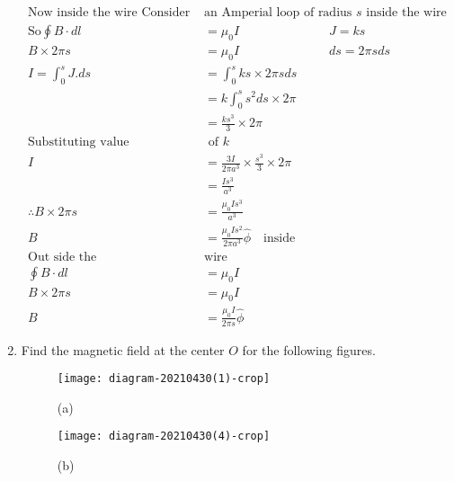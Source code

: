 \begin{enumerate}[ label=\color{ocre}\textbf{\arabic*.}]
\begin{answer}
\begin{align*}
		\text{Now inside the wire Consider }&\text{an Amperial loop of radius \ $s$\ inside the wire}\\
		\text{So}\oint B\cdot dl&=\mu_0I \hspace{3cm}J=ks\\
		B\times2\pi s&=\mu_0I\hspace{3cm}ds=2\pi sds\\
		I=\int_{0}^{s}J.ds&=\int_{0}^{s}ks\times2\pi sds\\
		&=k\int_{0}^{s}s^2 ds\times2\pi\\
		&=\frac{ks^3}{3}\times2\pi\\
		\text{Substituting  value }&\text{ of }k\\
		I&=\frac{3 I}{2\pi a^3}\times\frac{s^3}{3}\times2\pi\\
		&=\frac{Is^3}{a^3}\\
		\therefore B\times2\pi s&=\frac{\mu_0Is^3}{a^3}\\
		B&=\frac{\mu_0Is^2}{2\pi a^3}\hat{\phi} \quad \text{inside}\\
		\text{Out side the }&\text{wire}\\
		\oint B\cdot dl&=\mu_0I\\
		B\times2\pi s&=\mu_0I\\
		B&=\frac{\mu_0I}{2\pi s}\hat{\phi}
		\end{align*}
	\end{answer}
	\item Find the magnetic field at the center $O$ for the following figures.\\
	\begin{minipage}{0.45\textwidth}
		\begin{figure}[H]
			\begin{center}
				\texttt{[image: diagram-20210430(1)-crop]}
			\end{center}
			\caption{(a)}
		\end{figure}
	\end{minipage}
	\begin{minipage}{0.45\textwidth}
		\begin{figure}[H]
			\begin{center}
				\texttt{[image: diagram-20210430(4)-crop]}
			\end{center}
			\caption{(b)}
		\end{figure}
	\end{minipage}
	\begin{answer}
		\begin{align*}

\end{align*}
\end{answer}
\end{enumerate}
